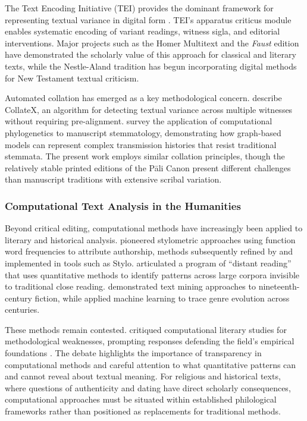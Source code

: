\documentclass[unnumsec,webpdf,contemporary,large]{oup-authoring-template}
\begin{document}
The Text Encoding Initiative (TEI) provides the dominant framework for representing textual variance in digital form \citep{tei2023}. TEI's apparatus criticus module enables systematic encoding of variant readings, witness sigla, and editorial interventions. Major projects such as the Homer Multitext \citep{dué2019} and the \emph{Faust} edition \citep{bohnenkamp2019} have demonstrated the scholarly value of this approach for classical and literary texts, while the Nestle-Aland tradition has begun incorporating digital methods for New Testament textual criticism.

Automated collation has emerged as a key methodological concern. \citet{dekker2015} describe CollateX, an algorithm for detecting textual variance across multiple witnesses without requiring pre-alignment. \citet{andrews2013} survey the application of computational phylogenetics to manuscript stemmatology, demonstrating how graph-based models can represent complex transmission histories that resist traditional stemmata. The present work employs similar collation principles, though the relatively stable printed editions of the Pāli Canon present different challenges than manuscript traditions with extensive scribal variation.

\subsubsection{Computational Text Analysis in the Humanities}

Beyond critical editing, computational methods have increasingly been applied to literary and historical analysis. \citet{burrows2002} pioneered stylometric approaches using function word frequencies to attribute authorship, methods subsequently refined by \citet{eder2016} and implemented in tools such as Stylo. \citet{moretti2013} articulated a program of ``distant reading'' that uses quantitative methods to identify patterns across large corpora invisible to traditional close reading. \citet{jockers2013} demonstrated text mining approaches to nineteenth-century fiction, while \citet{underwood2019} applied machine learning to trace genre evolution across centuries.

These methods remain contested. \citet{da2019} critiqued computational literary studies for methodological weaknesses, prompting responses defending the field's empirical foundations \citep{underwood2019response}. The debate highlights the importance of transparency in computational methods and careful attention to what quantitative patterns can and cannot reveal about textual meaning. For religious and historical texts, where questions of authenticity and dating have direct scholarly consequences, computational approaches must be situated within established philological frameworks rather than positioned as replacements for traditional methods.
\end{document}
